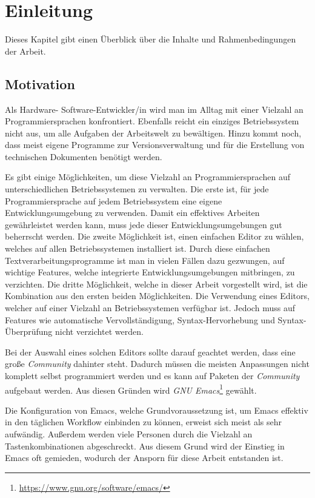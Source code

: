 \chapter{Einleitung}
Dieses Kapitel gibt einen Überblick über die Inhalte und
Rahmenbedingungen der Arbeit.
\label{cha:Einleitung}
\section{Motivation}
Als Hardware- Software-Entwickler/in wird man im Alltag mit einer
Vielzahl an Programmiersprachen konfrontiert. Ebenfalls reicht ein
einziges Betriebssystem nicht aus, um alle Aufgaben der Arbeitswelt zu
bewältigen. Hinzu kommt noch, dass meist eigene Programme zur
Versionsverwaltung und für die Erstellung von technischen Dokumenten
benötigt werden.

Es gibt einige Möglichkeiten, um diese Vielzahl an Programmiersprachen
auf unterschiedlichen Betriebssystemen zu verwalten. Die erste ist,
für jede Programmiersprache auf jedem Betriebssystem eine eigene
Entwicklungsumgebung zu verwenden. Damit ein effektives Arbeiten
gewährleistet werden kann, muss jede dieser Entwicklungsumgebungen gut
beherrscht werden. Die zweite Möglichkeit ist, einen einfachen Editor
zu wählen, welches auf allen Betriebssystemen installiert ist. Durch
diese einfachen Textverarbeitungsprogramme ist man in vielen Fällen
dazu gezwungen, auf wichtige Features, welche integrierte
Entwicklungsumgebungen mitbringen, zu verzichten. Die dritte
Möglichkeit, welche in dieser Arbeit vorgestellt wird, ist die
Kombination aus den ersten beiden Möglichkeiten. Die Verwendung eines
Editors, welcher auf einer Vielzahl an Betriebssystemen verfügbar
ist. Jedoch muss auf Features wie automatische Vervollständigung,
Syntax-Hervorhebung und Syntax-Überprüfung nicht verzichtet werden.

Bei der Auswahl eines solchen Editors sollte darauf geachtet werden,
dass eine große \textit{Community} dahinter steht. Dadurch müssen die
meisten Anpassungen nicht komplett selbst programmiert werden und es
kann auf Paketen der \textit{Community} aufgebaut werden. Aus diesen
Gründen wird \textit{GNU
  Emacs}\footnote{\url{https://www.gnu.org/software/emacs/}}
gewählt.

Die Konfiguration von Emacs, welche Grundvoraussetzung ist, um Emacs
effektiv in den täglichen Workflow einbinden zu können, erweist sich
meist als sehr aufwändig. Außerdem werden viele Personen durch die
Vielzahl an Tastenkombinationen abgeschreckt. Aus diesem Grund wird
der Einstieg in Emacs oft gemieden, wodurch der Ansporn für diese
Arbeit entstanden ist.\\

